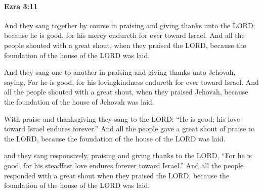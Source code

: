 		\paragraph{Ezra 3:11} %
			\label{EZRA-3-11}

			And they sang together by course in praising and giving thanks unto the LORD; because he is good, for his mercy endureth for ever toward Israel. And all the people shouted with a great shout, when they praised the LORD, because the foundation of the house of the LORD was laid.

			\begin{versebox}
					\item[BHS] 
					\item[LXX] 
					\item[ASV] And they sang one to another in praising and giving thanks unto Jehovah, saying, For he is good, for his lovingkindness endureth for ever toward Israel. And all the people shouted with a great shout, when they praised Jehovah, because the foundation of the house of Jehovah was laid.
					\item[NIV] With praise and thanksgiving they sang to the LORD: “He is good; his love toward Israel endures forever.” And all the people gave a great shout of praise to the LORD, because the foundation of the house of the LORD was laid.
					\item[NRSV] and they sang responsively, praising and giving thanks to the LORD, “For he is good, for his steadfast love endures forever toward Israel.” And all the people responded with a great shout when they praised the LORD, because the foundation of the house of the LORD was laid.
			\end{versebox}


